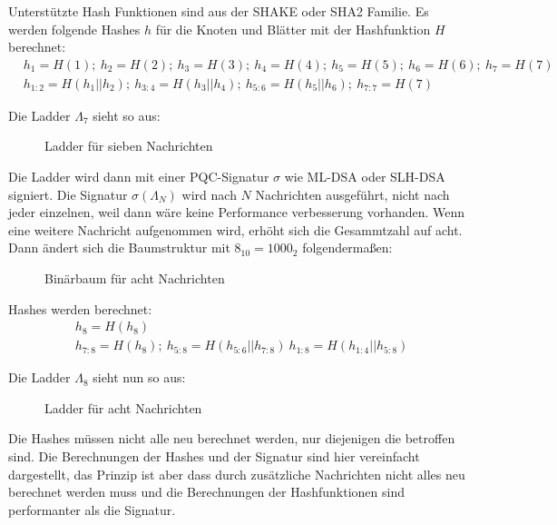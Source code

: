 Unterstützte Hash Funktionen sind aus der SHAKE oder SHA2 Familie.\cite{harveyMerkleTreeLadder2026}
Es werden folgende Hashes $h$ für die Knoten und Blätter mit der Hashfunktion $H$ berechnet:
\begin{align}
&h_{1}=H(1);\ h_{2}=H(2);\ h_{3}=H(3);\ h_{4}=H(4);\ h_{5}=H(5);\ h_{6}=H(6);\ h_{7}=H(7)\\
&h_{1:2}=H(h_{1}||h_{2});\ h_{3:4}=H(h_{3}||h_{4});\ h_{5:6}=H(h_{5}||h_{6});\ h_{7:7}=H(7)
\end{align}
\cite{cooperRecommendationStatefulHashBased2020a}

Die Ladder $\Lambda_{7}$ sieht so aus:
\begin{figure}[hbtp]
    \centering
    \siebenLadder
    \caption{Ladder für sieben Nachrichten}
    \label{Ladder sieben Nachrichten}
\end{figure}

Die Ladder wird dann mit einer PQC-Signatur $\sigma$ wie ML-DSA oder SLH-DSA signiert. Die Signatur $\sigma(\Lambda_{N})$ wird nach $N$ Nachrichten ausgeführt, nicht nach jeder einzelnen, weil dann wäre keine Performance verbesserung vorhanden.
Wenn eine weitere Nachricht aufgenommen wird, erhöht sich die Gesammtzahl auf acht. Dann ändert sich die Baumstruktur mit $8_{10} = 1000_{2}$ folgendermaßen:

\begin{figure}[htbp]
    \centering
    \achtErsterBaum
    \caption{Binärbaum für acht Nachrichten}
    \label{achtBaum}
\end{figure}

Hashes werden berechnet:
\begin{align}
    &h_8=H(h_8)\\
    &h_{7:8}=H(h_8);\ h_{5:8}=H(h_{5:6}||h_{7:8})\ h_{1:8}=H(h_{1:4}||h_{5:8})
\end{align}

Die Ladder $\Lambda_{8}$ sieht nun so aus:
\begin{figure}[hbtp]
    \centering
    \achtLadder
    \caption{Ladder für acht Nachrichten}
    \label{achtLadder}
\end{figure}

Die Hashes müssen nicht alle neu berechnet werden, nur diejenigen die betroffen sind. Die Berechnungen der Hashes und der Signatur sind hier vereinfacht dargestellt, das Prinzip ist aber dass durch zusätzliche Nachrichten nicht alles neu berechnet werden muss
und die Berechnungen der Hashfunktionen sind performanter als die Signatur.

